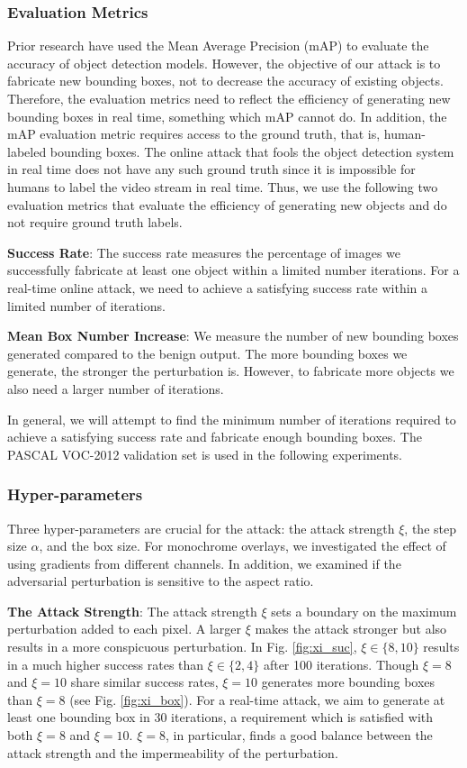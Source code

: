 \subsubsection{Evaluation Metrics}

Prior research have used the Mean Average Precision (mAP) \citep{map2018} to evaluate the accuracy of object detection models. However, the objective of our attack is to fabricate new bounding boxes, not to decrease the accuracy of existing objects. Therefore, the evaluation metrics need to reflect the efficiency of generating new bounding boxes in real time, something which mAP cannot do. In addition, the mAP evaluation metric requires access to the ground truth, that is, human-labeled bounding boxes. The online attack that fools the object detection system in real time does not have any such ground truth since it is impossible for humans to label the video stream in real time. Thus, we use the following two evaluation metrics that evaluate the efficiency of generating new objects and do not require ground truth labels.

\textbf{Success Rate}: The success rate measures the percentage of images we successfully fabricate at least one object within a limited number iterations. For a real-time online attack, we need to achieve a satisfying success rate within a limited number of iterations.

\textbf{Mean Box Number Increase}: We measure the number of new bounding boxes generated compared to the benign output. The more bounding boxes we generate, the stronger the perturbation is. However, to fabricate more objects we also need a larger number of iterations.

In general, we will attempt to find the minimum number of iterations required to achieve a satisfying success rate and fabricate enough bounding boxes. The PASCAL VOC-2012 validation set is used in the following experiments.

\subsubsection{Hyper-parameters}
\label{sec:hyper}

Three hyper-parameters are crucial for the attack: the attack strength $\xi$, the step size $\alpha$, and the box size. For monochrome overlays, we investigated the effect of using gradients from different channels. In addition, we examined if the adversarial perturbation is sensitive to the aspect ratio.

\textbf{The Attack Strength}: The attack strength $\xi$ sets a boundary on the maximum perturbation added to each pixel. A larger $\xi$ makes the attack stronger but also results in a more conspicuous perturbation. In Fig. \ref{fig:xi_suc}, $\xi \in \{8, 10\}$ results in a much higher success rates than $\xi \in \{2, 4\}$ after 100 iterations. Though $\xi=8$ and $\xi=10$ share similar success rates, $\xi=10$ generates more bounding boxes than $\xi=8$ (see Fig. \ref{fig:xi_box}). For a real-time attack, we aim to generate at least one bounding box in 30 iterations, a requirement which is satisfied with both $\xi=8$ and $\xi=10$. $\xi=8$, in particular, finds a good balance between the attack strength and the impermeability of the perturbation.

